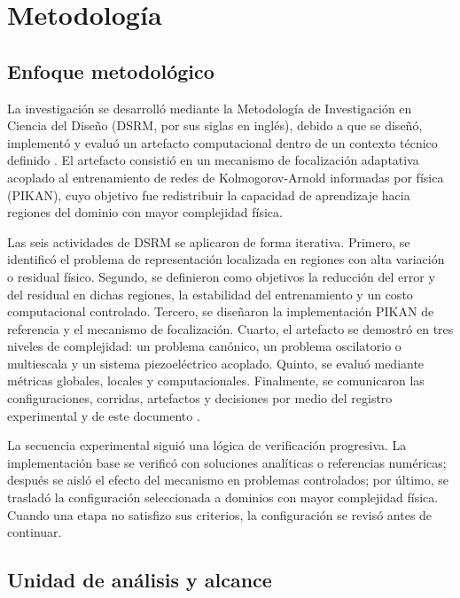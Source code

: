 \chapter{Metodología}
\label{sec:metodologia}

\section{Enfoque metodológico}
\label{subsec:enfoque-metodologico}

La investigación se desarrolló mediante la Metodología de Investigación en Ciencia del Diseño (DSRM, por sus siglas en inglés), debido a que se diseñó, implementó y evaluó un artefacto computacional dentro de un contexto técnico definido \cite{peffers2007dsrm}. El artefacto consistió en un mecanismo de focalización adaptativa acoplado al entrenamiento de redes de Kolmogorov-Arnold informadas por física (PIKAN), cuyo objetivo fue redistribuir la capacidad de aprendizaje hacia regiones del dominio con mayor complejidad física.

Las seis actividades de DSRM se aplicaron de forma iterativa. Primero, se identificó el problema de representación localizada en regiones con alta variación o residual físico. Segundo, se definieron como objetivos la reducción del error y del residual en dichas regiones, la estabilidad del entrenamiento y un costo computacional controlado. Tercero, se diseñaron la implementación PIKAN de referencia y el mecanismo de focalización. Cuarto, el artefacto se demostró en tres niveles de complejidad: un problema canónico, un problema oscilatorio o multiescala y un sistema piezoeléctrico acoplado. Quinto, se evaluó mediante métricas globales, locales y computacionales. Finalmente, se comunicaron las configuraciones, corridas, artefactos y decisiones por medio del registro experimental y de este documento \cite{peffers2007dsrm}.

La secuencia experimental siguió una lógica de verificación progresiva. La implementación base se verificó con soluciones analíticas o referencias numéricas; después se aisló el efecto del mecanismo en problemas controlados; por último, se trasladó la configuración seleccionada a dominios con mayor complejidad física. Cuando una etapa no satisfizo sus criterios, la configuración se revisó antes de continuar.

\section{Unidad de análisis y alcance}
\label{subsec:unidad-analisis}

